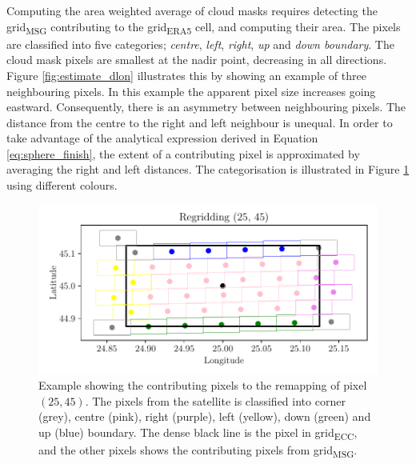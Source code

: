 Computing the area weighted average of cloud masks requires detecting the grid\textsubscript{MSG}
contributing to the grid\textsubscript{ERA5} cell, and computing their area. The pixels are classified into five categories; \textit{centre}, \textit{left}, \textit{right}, \textit{up} and \textit{down boundary}.
The cloud mask pixels are smallest at the nadir point, decreasing in all directions. Figure \ref{fig:estimate_dlon} illustrates this by showing an example of three neighbouring pixels. In this example the apparent pixel size increases going eastward. Consequently, there is an asymmetry between neighbouring pixels. The distance from the centre to the right and left neighbour is unequal. In order to take advantage of the analytical expression derived in Equation \eqref{eq:sphere_finish}, the extent of a contributing pixel is approximated by averaging the right and left distances. The categorisation is illustrated in Figure \ref{fig:pixels_contributing_to_cell} using different colours.

\begin{figure}
    \centering
    \includegraphics{python_figs/example_remapping_lat45_lon25.pdf}
    \caption{Example showing the contributing pixels to the remapping of pixel $(25, 45)$. The pixels from the satellite is classified into corner (grey), centre (pink), right (purple), left (yellow), down (green) and up (blue) boundary. The dense black line is the pixel in grid\textsubscript{ECC}, and the other pixels shows the contributing pixels from grid\textsubscript{MSG}.}
    \label{fig:pixels_contributing_to_cell}
\end{figure}

